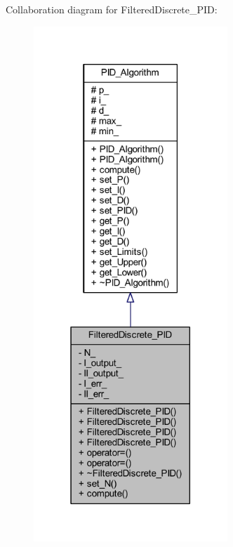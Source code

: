 Collaboration diagram for Filtered\+Discrete\+\_\+\+P\+ID\+:
\nopagebreak
\begin{figure}[H]
\begin{center}
\leavevmode
\includegraphics[height=550pt]{class_filtered_discrete___p_i_d__coll__graph}
\end{center}
\end{figure}
